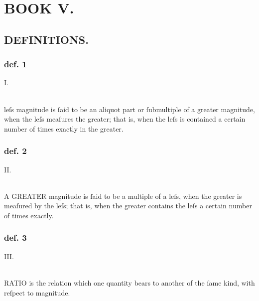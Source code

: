 \pagestyle{fancy}
\fancyhf{}
\renewcommand{\headrulewidth}{0pt}
%

\section[Book V]{\centering BOOK V.}
\label{sec:book5}

\hfill

\subsection[Definitions]{\centering \scshape{\LARGE{DEFINITIONS.}}}
\label{subsec:definitions}

\begin{center}
  \begin{minipage}{0.8\textwidth}
    \subsubsection{def. 1}
    \begin{center}
      I.\label{book5def1}\\
      \hfill\\
      \raggedright \lettrine[lines=3, loversize=1, nindent=0pt]{}{} leſs magnitude is ſaid to be an aliquot part or ſubmultiple of a greater magnitude, when the leſs meaſures the greater; that is, when the leſs is contained a certain number of times exactly in the greater.
    \end{center}
    \subsubsection{def. 2}
    \begin{center}
      II.\label{book5def2}\\
      \hfill\\
      \raggedright A \textsc{GREATER} magnitude is ſaid to be a multiple of a leſs, when the greater is meaſured by the leſs; that is, when the greater contains the leſs a certain number of times exactly.
    \end{center}
    \subsubsection{def. 3}
    \begin{center}
      III.\label{book5def3}\\
      \hfill\\
      \raggedright R\textsc{ATIO} is the relation which one quantity bears to another of the ſame kind, with reſpect to magnitude.
    \end{center}

\end{minipage}
\end{center}
